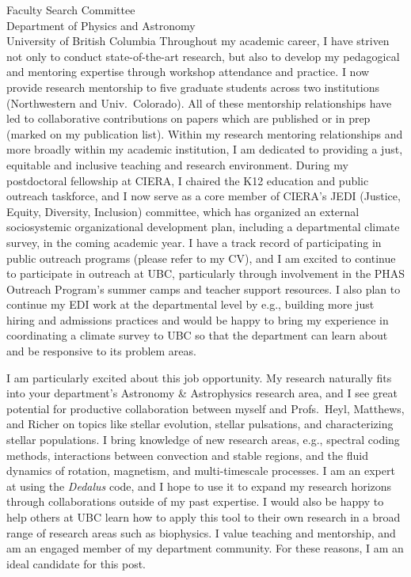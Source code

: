 \documentclass[12pt]{letter}
\begin{document}
\begin{letter}{
               Faculty Search Committee \\
               Department of Physics and Astronomy \\
               University of British Columbia
           }
    Throughout my academic career, I have striven not only to conduct state-of-the-art research, but also to develop my pedagogical and mentoring expertise through workshop attendance and practice.
    I now provide research mentorship to five graduate students across two institutions (Northwestern and Univ.~Colorado).
    All of these mentorship relationships have led to collaborative contributions on papers which are published or in prep (marked on my publication list).
    Within my research mentoring relationships and more broadly within my academic institution, I am dedicated to providing a just, equitable and inclusive teaching and research environment.
    During my postdoctoral fellowship at CIERA, I chaired the K12 education and public outreach taskforce, and I now serve as a core member of CIERA's JEDI (Justice, Equity, Diversity, Inclusion) committee, which has organized an external sociosystemic organizational development plan, including a departmental climate survey, in the coming academic year.
    I have a track record of participating in public outreach programs (please refer to my CV), and I am excited to continue to participate in outreach at UBC, particularly through involvement in the PHAS Outreach Program's summer camps and teacher support resources.
    I also plan to continue my EDI work at the departmental level by e.g., building more just hiring and admissions practices and would be happy to bring my experience in coordinating a climate survey to UBC so that the department can learn about and be responsive to its problem areas.


    I am particularly excited about this job opportunity.
    My research naturally fits into your department's Astronomy \& Astrophysics research area, and I see great potential for productive collaboration between myself and Profs.~Heyl, Matthews, and Richer on topics like stellar evolution, stellar pulsations, and characterizing stellar populations.
    I bring knowledge of new research areas, e.g., spectral coding methods, interactions between convection and stable regions, and the fluid dynamics of rotation, magnetism, and multi-timescale processes.
    I am an expert at using the \emph{Dedalus} code, and I hope to use it to expand my research horizons through collaborations outside of my past expertise.
    I would also be happy to help others at UBC learn how to apply this tool to their own research in a broad range of research areas such as biophysics.
    I value teaching and mentorship, and am an engaged member of my department community.
    For these reasons, I am an ideal candidate for this post.


\end{letter}
\end{document}
